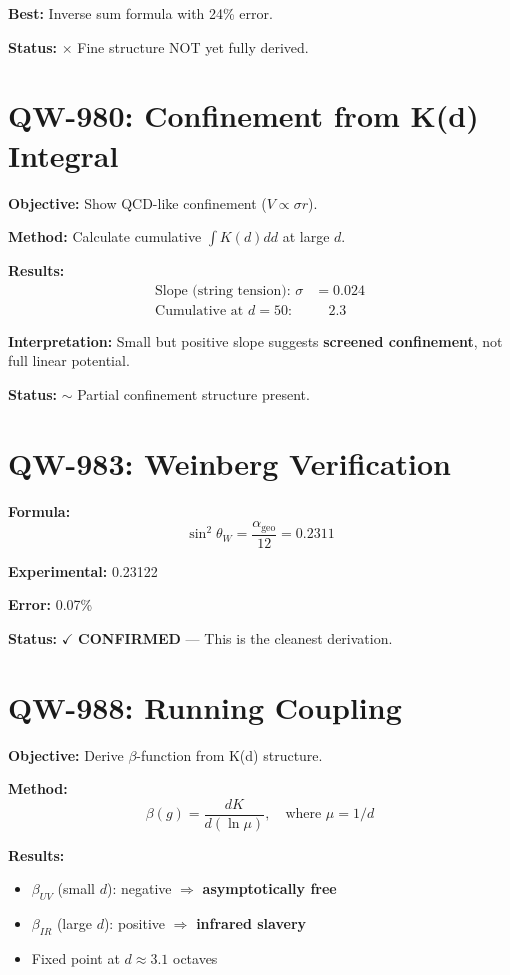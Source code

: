 \documentclass[11pt,a4paper]{book}
\theoremstyle{remark}
\newcommand{\alphageo}{\alpha_{\text{geo}}}
\begin{document}
\textbf{Best:} Inverse sum formula with 24\% error.

\textbf{Status:} $\times$ Fine structure NOT yet fully derived.

\section{QW-980: Confinement from K(d) Integral}

\textbf{Objective:} Show QCD-like confinement ($V \propto \sigma r$).

\textbf{Method:} Calculate cumulative $\int K(d) dd$ at large $d$.

\textbf{Results:}
\begin{align}
\text{Slope (string tension): } \sigma &= 0.024 \\
\text{Cumulative at } d=50: & \quad 2.3
\end{align}

\textbf{Interpretation:} Small but positive slope suggests \textbf{screened confinement}, not full linear potential.

\textbf{Status:} $\sim$ Partial confinement structure present.

\section{QW-983: Weinberg Verification}

\textbf{Formula:}
\begin{equation}
\sin^2\theta_W = \frac{\alphageo}{12} = 0.2311
\end{equation}

\textbf{Experimental:} 0.23122

\textbf{Error:} 0.07\%

\textbf{Status:} $\checkmark$ \textbf{CONFIRMED} --- This is the cleanest derivation.

\section{QW-988: Running Coupling}

\textbf{Objective:} Derive $\beta$-function from K(d) structure.

\textbf{Method:}
\begin{equation}
\beta(g) = \frac{dK}{d(\ln\mu)}, \quad \text{where } \mu = 1/d
\end{equation}

\textbf{Results:}
\begin{itemize}
    \item $\beta_{UV}$ (small $d$): negative $\Rightarrow$ \textbf{asymptotically free}
    \item $\beta_{IR}$ (large $d$): positive $\Rightarrow$ \textbf{infrared slavery}
    \item Fixed point at $d \approx 3.1$ octaves
\end{itemize}
\end{document}
